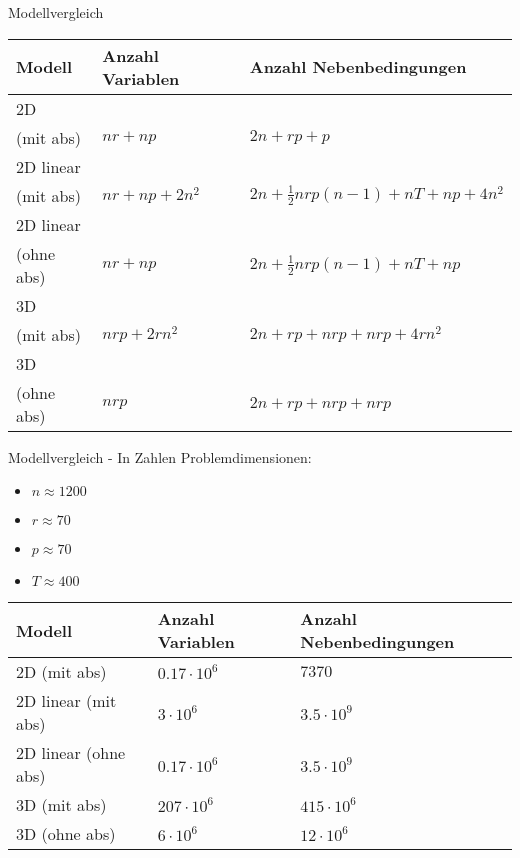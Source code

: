 \documentclass[11pt]{beamer}
\begin{document}
  \begin{frame}
                {Modellvergleich}
                
        \begin{center}
        \begin{tabular}{ | l | l | l |}
            \hline 
            Modell & Anzahl Variablen & Anzahl Nebenbedingungen \\
            \hline \hline
            2D  & & \\ (mit abs)& $nr + np$ & $2n + rp + p$ \\ \hline
            2D linear & & \\ (mit abs)& $nr + np + 2 n^2$ & $2n + \frac 1 2 nrp(n-1) + nT + np + 4 n^2$ \\ \hline
            2D linear  & & \\ (ohne abs)& $nr + np$ & $2n + \frac 1 2 nrp(n-1) + nT + np $\\ \hline 
            3D & & \\ (mit abs) & $nrp + 2rn^2$ & $2n + rp + nrp + nrp + 4rn^2$\\
            \hline
            3D  & & \\ (ohne abs)& $nrp$ & $2n + rp + nrp + nrp$ \\ \hline
            
        \end{tabular}
        \end{center}
    \end{frame}
    \begin{frame}
            {Modellvergleich - In Zahlen}
       Problemdimensionen:
        \begin{itemize}
        \item $n \approx 1200$
        \item $r \approx 70$
        \item $p \approx 70$
        \item $T \approx 400$
        \end{itemize}
        \begin{center}
        \begin{tabular}{ | l | l | l |}
            \hline 
            Modell & Anzahl Variablen & Anzahl Nebenbedingungen \\
            \hline \hline
            2D (mit abs)& $0.17 \cdot 10^6$ & $7370$ \\ \hline
            2D linear (mit abs)& $3 \cdot 10^6$ & $3.5 \cdot 10^9$ \\ \hline
            2D linear (ohne abs)& $0.17 \cdot 10^6$ & $3.5 \cdot 10^9$\\ \hline 
            3D (mit abs) & $207 \cdot 10^6$ & $415 \cdot 10^6$\\
            \hline
            3D (ohne abs)& $6 \cdot 10^6$ & $12 \cdot 10^6$ \\ \hline
        \end{tabular}
        \end{center}
  \end{frame}
  
\end{document}
